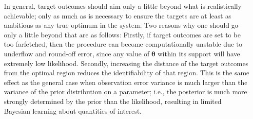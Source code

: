 \documentclass[12pt]{article}
\begin{document}
%
In general, target outcomes should aim only a little beyond what is realistically achievable; only as much as is necessary to ensure the targets are at least as ambitious as any true optimum in the system.
%
Two reasons why one should go only a little beyond that are as follows: 
%
Firstly, if target outcomes are set to be too farfetched, then the procedure can become computationally unstable due  to underflow and round-off error, since any value of $\boldsymbol \theta$ within its support will have extremely low likelihood.
%
Secondly, increasing the distance of the target outcomes from the optimal region reduces the identifiability of that region.
%
% 
This is the same effect as the general case when observation error variance is much larger than the variance of the prior distribution on a parameter; i.e., the posterior is much more strongly determined by the prior than the likelihood, resulting in limited Bayesian learning about quantities of interest.
%
%
%


%
\end{document}
